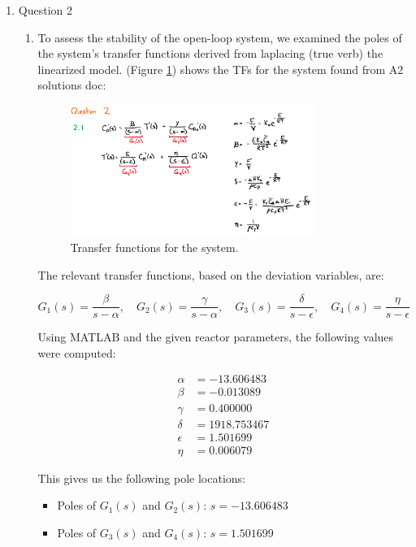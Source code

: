 \documentclass[12pt]{article}
\begin{document}
\begin{enumerate}
\pagebreak

\item Question 2
  \begin{enumerate}
    \item To assess the stability of the open-loop system, we examined the poles of the system's transfer functions derived from laplacing (true verb) the linearized model. (Figure \ref{fig:figure2_1}) shows the TFs for the system found from A2 solutions doc:
        
    \begin{figure}[H]
      \centering
      \includegraphics[width=0.8\textwidth]{Figures/figure2_1.png}
      \caption{Transfer functions for the system.}
      \label{fig:figure2_1}
    \end{figure}

    The relevant transfer functions, based on the deviation variables, are:

    \[
    G_1(s) = \frac{\beta}{s - \alpha}, \quad
    G_2(s) = \frac{\gamma}{s - \alpha}, \quad
    G_3(s) = \frac{\delta}{s - \epsilon}, \quad
    G_4(s) = \frac{\eta}{s - \epsilon}
    \]
    
    Using MATLAB and the given reactor parameters, the following values were computed:
    
    \begin{align*}
    \alpha &= -13.606483 \\
    \beta  &= -0.013089 \\
    \gamma &= 0.400000 \\
    \delta &= 1918.753467 \\
    \epsilon &= 1.501699 \\
    \eta &= 0.006079
    \end{align*}
    
    This gives us the following pole locations:
    
    \begin{itemize}
        \item Poles of \( G_1(s) \) and \( G_2(s) \): \( s = -13.606483 \)
        \item Poles of \( G_3(s) \) and \( G_4(s) \): \( s = 1.501699 \)
    \end{itemize}
    

\end{enumerate}
\end{enumerate}
\end{document}

